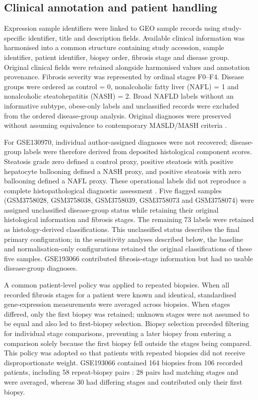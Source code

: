 \documentclass[11pt,a4paper]{article}
\begin{document}
\subsection*{Clinical annotation and patient handling}
Expression sample identifiers were linked to GEO sample records using study-specific identifier, title and description fields. Available clinical information was harmonised into a common structure containing study accession, sample identifier, patient identifier, biopsy order, fibrosis stage and disease group. Original clinical fields were retained alongside harmonised values and annotation provenance. Fibrosis severity was represented by ordinal stages F0--F4. Disease groups were ordered as control = 0, nonalcoholic fatty liver (NAFL) = 1 and nonalcoholic steatohepatitis (NASH) = 2. Broad NAFLD labels without an informative subtype, obese-only labels and unclassified records were excluded from the ordered disease-group analysis. Original diagnoses were preserved without assuming equivalence to contemporary MASLD/MASH criteria \cite{ref3}.

For GSE130970, individual author-assigned diagnoses were not recovered; disease-group labels were therefore derived from deposited histological component scores. Steatosis grade zero defined a control proxy, positive steatosis with positive hepatocyte ballooning defined a NASH proxy, and positive steatosis with zero ballooning defined a NAFL proxy. These operational labels did not reproduce a complete histopathological diagnostic assessment \cite{ref4}. Five flagged samples (GSM3758028, GSM3758038, GSM3758039, GSM3758073 and GSM3758074) were assigned unclassified disease-group status while retaining their original histological information and fibrosis stages. The remaining 73 labels were retained as histology-derived classifications. This unclassified status describes the final primary configuration; in the sensitivity analyses described below, the baseline and normalisation-only configurations retained the original classifications of these five samples. GSE193066 contributed fibrosis-stage information but had no usable disease-group diagnoses.

A common patient-level policy was applied to repeated biopsies. When all recorded fibrosis stages for a patient were known and identical, standardised gene-expression measurements were averaged across biopsies. When stages differed, only the first biopsy was retained; unknown stages were not assumed to be equal and also led to first-biopsy selection. Biopsy selection preceded filtering for individual stage comparisons, preventing a later biopsy from entering a comparison solely because the first biopsy fell outside the stages being compared. This policy was adopted so that patients with repeated biopsies did not receive disproportionate weight. GSE193066 contained 164 biopsies from 106 recorded patients, including 58 repeat-biopsy pairs \cite{ref10}: 28 pairs had matching stages and were averaged, whereas 30 had differing stages and contributed only their first biopsy.
\end{document}
